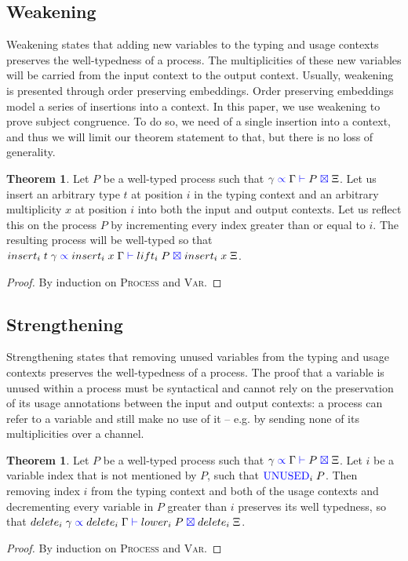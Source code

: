 \documentclass[a4paper,UKenglish,cleveref, autoref, thm-restate,authorcolumns]{lipics-v2019}
\theoremstyle{definition}
\newtheorem{nitheorem}[theorem]{Theorem}
\newcommand{\type}[1]{\textcolor{blue}{\operatorname{#1}}}
\newcommand{\types}[4]{#1 \; \type{\propto} \; #2 \; \type{\vdash} \; #3 \; \type{\boxtimes} \; #4}
\newcommand{\Unused}{\type{UNUSED}}
\begin{document}
\subsection{Weakening}
\label{weakening}

Weakening states that adding new variables to the typing and usage contexts preserves the well-typedness of a process.
The multiplicities of these new variables will be carried from the input context to the output context.
Usually, weakening is presented through order preserving embeddings.
Order preserving embeddings model a series of insertions into a context.
In this paper, we use weakening to prove subject congruence.
To do so, we need of a single insertion into a context, and thus we will limit our theorem statement to that, but there is no loss of generality.

\begin{nitheorem}
  \label{thm:weakening}
  Let $P$ be a well-typed process such that $\types{\gamma}{\Gamma}{P}{\Xi}$.
  Let us insert an arbitrary type $t$ at position $i$ in the typing context and an arbitrary multiplicity $x$ at position $i$ into both the input and output contexts.
  Let us reflect this on the process $P$ by incrementing every index greater than or equal to $i$.
  The resulting process will be well-typed so that $\types{insert_i \; t \; \gamma}{insert_i \; x \; \Gamma}{lift_i \; P}{insert_i \; x \; \Xi}$.
\end{nitheorem}
\begin{proof}
  By induction on \textsc{Process} and \textsc{Var}.
\end{proof}

\subsection{Strengthening}
\label{strengthening}

Strengthening states that removing unused variables from the typing and usage contexts preserves the well-typedness of a process.
The proof that a variable is unused within a process must be syntactical and cannot rely on the preservation of its usage annotations between the input and output contexts: a process can refer to a variable and still make no use of it -- e.g. by sending none of its multiplicities over a channel.

\begin{nitheorem}
  \label{thm:strengthening}
  Let $P$ be a well-typed process such that $\types{\gamma}{\Gamma}{P}{\Xi}$.
  Let $i$ be a variable index that is not mentioned by $P$, such that $\Unused_i \; P$.
  Then removing index $i$ from the typing context and both of the usage contexts and decrementing every variable in $P$ greater than $i$ preserves its well typedness, so that $\types{delete_i \; \gamma}{delete_i \; \Gamma}{lower_i \; P}{delete_i \; \Xi}$.
\end{nitheorem}
\begin{proof}
  By induction on \textsc{Process} and \textsc{Var}.
\end{proof}
\end{document}
